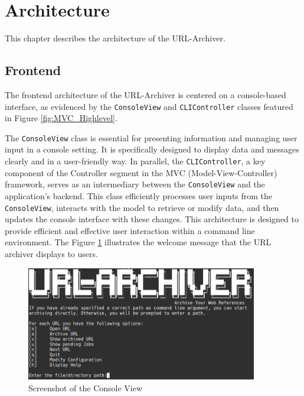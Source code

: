 \section{Architecture}
This chapter describes the architecture of the URL-Archiver. 

\subsection{Frontend}
The frontend architecture of the URL-Archiver is centered on a console-based interface, as evidenced by the \texttt{ConsoleView} and \texttt{CLIController} classes featured in Figure \ref{fig:MVC_Highlevel}.

The \texttt{ConsoleView} class is essential for presenting information and managing user input in a console setting. It is specifically designed to display data and messages clearly and in a user-friendly way. In parallel, the \texttt{CLIController}, a key component of the Controller segment in the MVC (Model-View-Controller)  framework, serves as an intermediary between the \texttt{ConsoleView} and the application’s backend. This class efficiently processes user inputs from the \texttt{ConsoleView}, interacts with the model to retrieve or modify data, and then updates the console interface with these changes. This architecture is designed to provide efficient and effective user interaction within a command line environment. The Figure \ref{fig:Screenshot_ConsoleView} illustrates the welcome message that the URL archiver displays to users.
\begin{figure}[h!]
    \center
    \includegraphics[width=0.9\textwidth]{pictures/final_presentation/command_line_application.jpg}
    \caption{Screenshot of the Console View}
    \label{fig:Screenshot_ConsoleView}
\end{figure}



